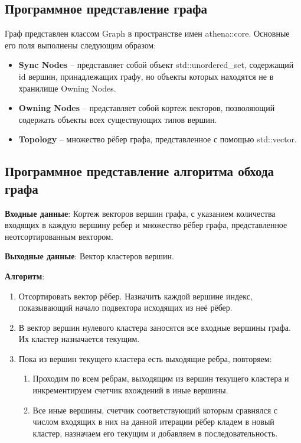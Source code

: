 \subsection{Программное представление графа}
\label{sec:softwarepresentationgraph}
Граф представлен классом Graph в пространстве имен athena::core. Основные его поля выполнены следующим образом:
\begin{itemize}
    \item \textbf{Sync Nodes} -- представляет собой объект std::unordered\_set, содержащий id вершин, принадлежащих графу, но объекты которых находятся не в хранилище Owning Nodes.
    \item \textbf{Owning Nodes} -- представляет собой кортеж векторов, позволяющий содержать объекты всех существующих типов вершин.
    \item \textbf{Topology} -- множество рёбер графа, представленное с помощью std::vector.
\end{itemize}
\subsection{Программное представление алгоритма обхода графа}
\label{sec:softwarepresentationgraph}
\textbf{Входные данные}: Кортеж векторов вершин графа, с указанием количества входящих в каждую вершину ребер и множество рёбер графа, представленное неотсортированным вектором.
\par
\textbf{Выходные данные}: Вектор кластеров вершин.
\par
\textbf{Алгоритм}: \begin{enumerate}
    \item Отсортировать вектор рёбер. Назначить каждой вершине индекс, показывающий начало подвектора исходящих из неё рёбер. 
    \item В вектор вершин нулевого кластера заносятся все входные вершины графа. Их кластер назначается текущим.
    \item Пока из вершин текущего кластера есть выходящие ребра, повторяем:
    \begin{enumerate}
        \item Проходим по всем ребрам, выходящим из вершин текущего кластера и инкрементируем счетчик вхождений в иные вершины.
        \item Все иные вершины, счетчик соответствующий которым сравнялся с числом входящих в них на данной итерации рёбер кладем в новый кластер, назначаем его текущим и добавляем в последовательность.
    \end{enumerate}
\end{enumerate}
